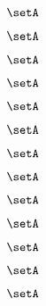 \begin{forslides}
    \begin{equation}
        \label{eq:slides-processes-77}
        \setA
    \end{equation}

    \begin{equation}
        \label{eq:slides-processes-78}
        \setA
    \end{equation}

    \begin{equation}
        \label{eq:slides-processes-79}
        \setA
    \end{equation}

    \begin{equation}
        \label{eq:slides-processes-80}
        \setA
    \end{equation}

    \begin{equation}
        \label{eq:slides-processes-81}
        \setA
    \end{equation}

    \begin{equation}
        \label{eq:slides-processes-82}
        \setA
    \end{equation}

    \begin{equation}
        \label{eq:slides-processes-83}
        \setA
    \end{equation}

    \begin{equation}
        \label{eq:slides-processes-84}
        \setA
    \end{equation}

    \begin{equation}
        \label{eq:slides-processes-85}
        \setA
    \end{equation}

    \begin{equation}
        \label{eq:slides-processes-86}
        \setA
    \end{equation}

    \begin{equation}
        \label{eq:slides-processes-87}
        \setA
    \end{equation}

    \begin{equation}
        \label{eq:slides-processes-88}
        \setA
    \end{equation}

    \begin{equation}
        \label{eq:slides-processes-89}
        \setA
    \end{equation}


\end{forslides}
